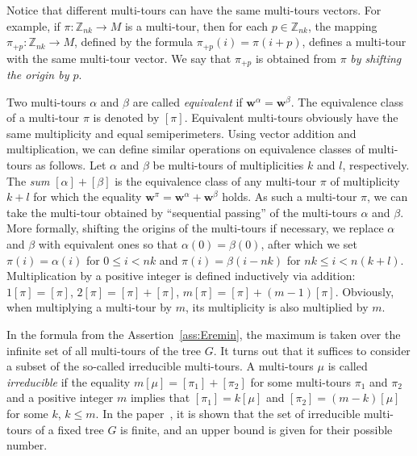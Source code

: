 \documentclass[10pt]{article}
\theoremstyle{plain}
\theoremstyle{definition}
\def\bw{\boldsymbol{w}}
\def\:{\colon}
\def\a{\alpha}
\def\b{\beta}
\newcommand{\Z}{{\mathbb Z}}
\begin{document}
Notice that different multi-tours can have the same multi-tours vectors. For example, if $\pi\:\Z_{nk}\to M$ is a multi-tour, then for each $p\in\Z_{nk}$, the mapping $\pi_{+p}\:\Z_{nk}\to M$, defined by the formula $\pi_{+p}(i)=\pi(i+p)$, defines a multi-tour with the same multi-tour vector. We say that $\pi_{+p}$ is obtained from $\pi$ \emph{by shifting the origin by $p$}.

Two multi-tours $\a$ and $\b$ are called \emph{equivalent\/} if $\bw^\a=\bw^\b$. The equivalence class of a multi-tour $\pi$ is denoted by $[\pi]$. Equivalent multi-tours obviously have the same multiplicity and equal semiperimeters. Using vector addition and multiplication, we can define similar operations on equivalence classes of multi-tours as follows. Let $\a$ and $\b$ be multi-tours of multiplicities $k$ and $l$, respectively. The \emph{sum\/} $[\a]+[\b]$ is the equivalence class of any multi-tour $\pi$ of multiplicity $k+l$ for which the equality $\bw^\pi=\bw^{\a}+\bw^{\b}$ holds. As such a multi-tour $\pi$, we can take the multi-tour obtained by ``sequential passing'' of the multi-tours $\a$ and $\b$. More formally, shifting the origins of the multi-tours if necessary, we replace $\a$ and $\b$ with equivalent ones so that $\a(0)=\b(0)$, after which we set $\pi(i)=\a(i)$ for $0\le i< nk$ and $\pi(i)=\b(i-nk)$ for $nk\le i<n(k+l)$. Multiplication by a positive integer is defined inductively via addition: $1[\pi]=[\pi]$, $2[\pi]=[\pi]+[\pi]$, $m[\pi]=[\pi]+(m-1)[\pi]$. Obviously, when multiplying a multi-tour by $m$, its multiplicity is also multiplied by $m$.

In the formula from the Assertion~\ref{ass:Eremin}, the maximum is taken over the infinite set of all multi-tours of the tree $G$. It turns out that it suffices to consider a subset of the so-called irreducible multi-tours. A multi-tours $\mu$ is called \emph{irreducible\/} if the equality $m[\mu]=[\pi_1]+[\pi_2]$ for some multi-tours $\pi_1$ and $\pi_2$ and a positive integer $m$ implies that $[\pi_1]=k[\mu]$ and $[\pi_2]=(m-k)[\mu]$ for some $k$, $k\le m$. In the paper~\cite{Eremin}, it is shown that the set of irreducible multi-tours of a fixed tree $G$ is finite, and an upper bound is given for their possible number.

\end{document}
